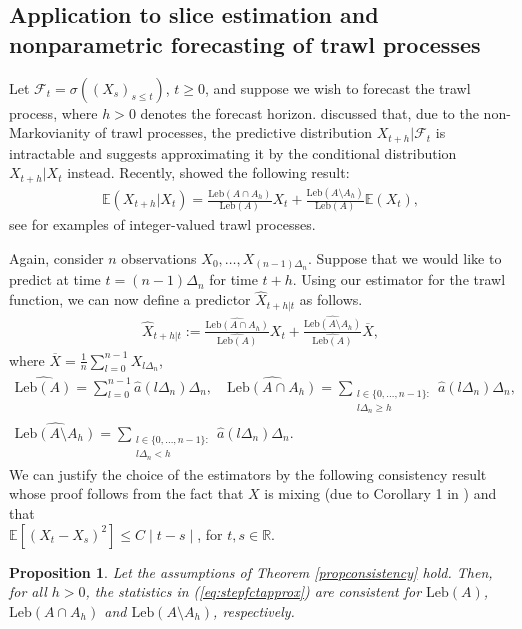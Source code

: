 \documentclass{article}
\theoremstyle{plain}
\newtheorem{proposition}{Proposition}
\theoremstyle{definition}
\theoremstyle{remark}
\newcommand{\Leb}{\ensuremath{\mathrm{Leb}}}
\begin{document}
\subsection{Application to slice estimation and nonparametric forecasting of trawl processes}\label{sec:TheoryForecasting}	
Let $\mathcal{F}_t = \sigma((X_s)_{s \leq t})$, $t\geq 0$,  and suppose we wish to forecast the trawl process, where  $h>0$ denotes the  forecast horizon. 
\cite{BNLSV2014} discussed that, due to the non-Markovianity of trawl processes, the  predictive distribution $X_{t+h}|\mathcal{F}_t$
is intractable and suggests approximating it by the conditional distribution
$X_{t+h}|X_t$ instead.
Recently, \cite{DL2022} showed the following result:
\begin{align}\label{eq:predictor}
	\mathbb{E}(X_{t+h}|X_t)=\frac{\Leb(A\cap A_h)}{\Leb(A)}X_t+\frac{\Leb(A\setminus A_h)}{\Leb(A)}\mathbb{E}(X_t),
\end{align}
see \cite{BLSV2021} for examples of integer-valued trawl processes. 

Again, consider $n$ observations $X_0, \ldots, X_{(n-1)\Delta_n}$. Suppose that we would like to predict at time $t=(n-1)\Delta_n$ for time $t+h$. 
Using our estimator for the trawl function, we can now define a predictor $\hat X_{t+h|t}$ as follows. 
\begin{align}\label{eq:predictor-est}
	\hat X_{t+h|t}:=	\frac{\widehat{\Leb(A\cap A_h)}}{\widehat{\Leb(A)}}X_t+\frac{\widehat{\Leb(A\setminus A_h)}}{\widehat{\Leb(A)}}\overline X,
\end{align}
where 	$\overline X= \frac{1}{n}\sum_{l=0}^{n-1}X_{l\Delta_n}$,
\begin{multline}\label{eq:stepfctapprox}
		\widehat{\Leb(A)}=	\sum_{l=0}^{n-1}\hat a(l\Delta_n)\Delta_n, \quad  
		\widehat{	\Leb(A\cap A_h)} =\sum_{\substack{l\in \{0, \ldots, n-1\}:\\ l\Delta_n \geq h}} \hat a(l\Delta_n)\Delta_n,
		\\
		\widehat{\Leb(A\setminus A_h)}=\sum_{\substack{l\in \{0, \ldots, n-1\}:\\ l\Delta_n < h}} \hat a(l\Delta_n)\Delta_n.
\end{multline}
We can justify the choice of the estimators by the following consistency result whose proof follows from the fact that $X$ is mixing (due to Corollary 1 in \cite{RosZak96}) and that\\ $\mathbb{E}[(X_t-X_s)^2] \leq C\mid t-s\mid$, for $t,s\in \mathbb{R}$.
\begin{proposition}\label{prop:consistencyforecast}
	Let the assumptions of Theorem \ref{propconsistency} hold. Then, for all $h>0$, the statistics in (\ref{eq:stepfctapprox}) are consistent for $\Leb(A)$,  $\Leb(A\cap A_h)$ and $\Leb(A\setminus A_h)$, respectively.	
\end{proposition}
\end{document}
